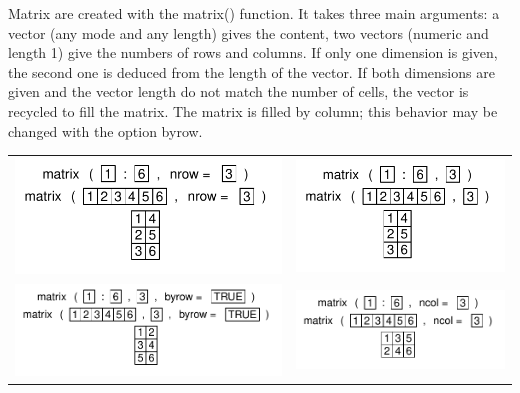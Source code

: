 \documentclass[pdflatex]{article}
\begin{document}
Matrix are created with the matrix() function. It takes three main arguments: a
vector (any mode and any length) gives the content, two vectors (numeric and
length 1) give the numbers of rows and columns. If only one dimension is given,
the second one is deduced from the length of the vector. If both dimensions are
given and the vector length do not match the number of cells, the vector is
recycled to fill the matrix. The matrix is filled by column; this behavior may
be changed with the option byrow. 

\begin{tabular}{cc}
\includegraphics{matrix} & \includegraphics{matrix_arg}\\
\includegraphics{matrix_byrow} & \includegraphics{matrix_nbcol}\\

\end{tabular}
\end{document}
